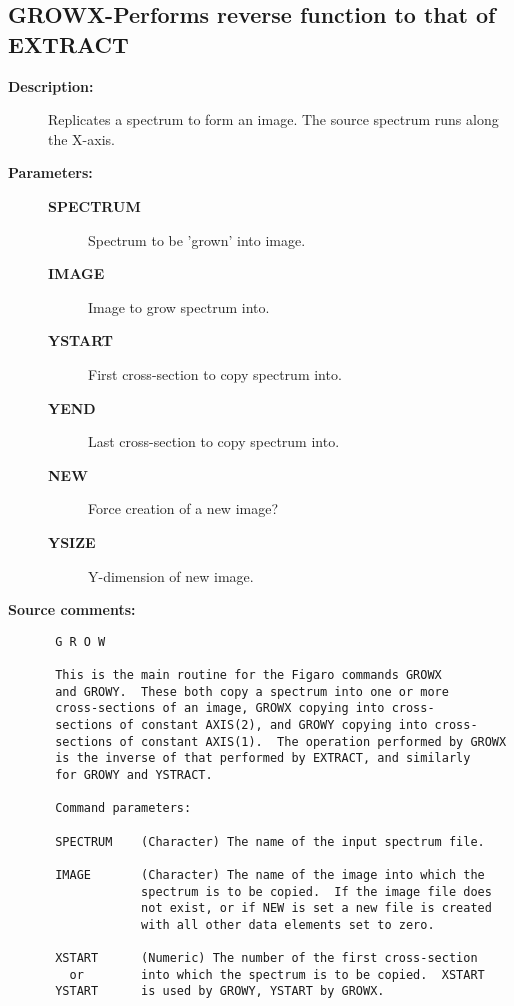 \subsection{GROWX-\label{GROWX}Performs reverse function to that of EXTRACT}
\begin{description}

\item [{\bf Description:}]
 Replicates a spectrum to form an image.  The source spectrum
 runs along the X-axis.

\item [{\bf Parameters:}]
\begin{description}
\item [{\bf SPECTRUM}]
 Spectrum to be 'grown' into image.
\item [{\bf IMAGE}]
 Image to grow spectrum into.
\item [{\bf YSTART}]
 First cross-section to copy spectrum into.
\item [{\bf YEND}]
 Last cross-section to copy spectrum into.
\item [{\bf NEW}]
 Force creation of a new image?
\item [{\bf YSIZE}]
 Y-dimension of new image.
\end{description}

\item [{\bf Source comments:}]
\begin{verbatim}
 G R O W

 This is the main routine for the Figaro commands GROWX
 and GROWY.  These both copy a spectrum into one or more
 cross-sections of an image, GROWX copying into cross-
 sections of constant AXIS(2), and GROWY copying into cross-
 sections of constant AXIS(1).  The operation performed by GROWX
 is the inverse of that performed by EXTRACT, and similarly
 for GROWY and YSTRACT.

 Command parameters:

 SPECTRUM    (Character) The name of the input spectrum file.

 IMAGE       (Character) The name of the image into which the
             spectrum is to be copied.  If the image file does
             not exist, or if NEW is set a new file is created
             with all other data elements set to zero.

 XSTART      (Numeric) The number of the first cross-section
   or        into which the spectrum is to be copied.  XSTART
 YSTART      is used by GROWY, YSTART by GROWX.


\end{verbatim}
\end{description}
